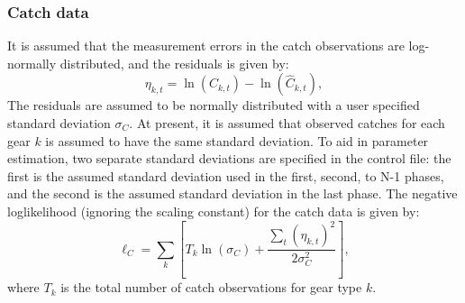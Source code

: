 \subsubsection{Catch data}
It is assumed that the measurement errors in the catch observations are log-normally distributed, and the residuals is given by:
\begin{equation}\label{eq2}
\eta_{k,t}=\ln(C_{k,t}) -  \ln(\hat{C}_{k,t}),
\end{equation}
The residuals are assumed to be normally distributed with a user specified standard deviation $\sigma_{C}$.  At present, it is assumed that observed catches for each gear $k$ is assumed to have the same standard deviation.  To aid in parameter estimation, two separate standard deviations are specified in the control file: the first is the assumed standard deviation used in the first, second, to N-1 phases, and the second is the assumed standard deviation in the last phase.  The negative loglikelihood (ignoring the scaling constant) for the catch data is given by:
\begin{equation}\label{eq3}
\ell_C = \sum_k\left[  T_k\ln(\sigma_C)+\frac{\sum_t(\eta_{k,t})^2}{2\sigma_C^2}\right],
\end{equation}
where $T_k$ is the total number of catch observations for gear type $k$.



